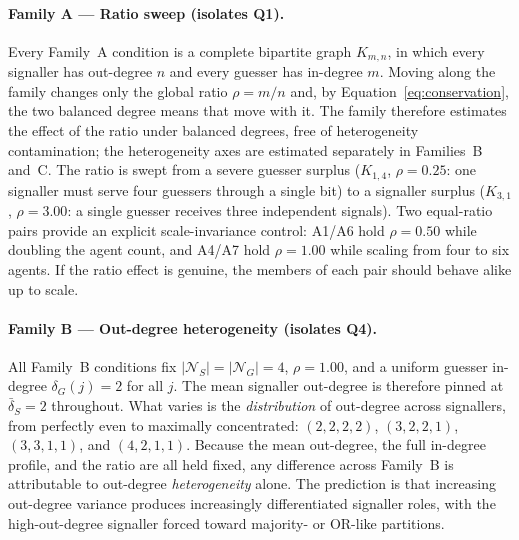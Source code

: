\documentclass[a4paper,twoside,12pt]{report}
\begin{document}
    \paragraph{Family A --- Ratio sweep (isolates Q1).}
    Every Family~A condition is a complete bipartite graph $K_{m,n}$, in which
    every signaller has out-degree $n$ and every guesser has in-degree $m$.
    Moving along the family changes only the global ratio
    $\rho = m/n$ and, by Equation~\eqref{eq:conservation}, the two balanced
    degree means that move with it. The family therefore estimates the effect
    of the ratio under balanced degrees, free of heterogeneity contamination;
    the heterogeneity axes are estimated separately in Families~B and~C. The
    ratio is swept from a severe guesser surplus ($K_{1,4}$, $\rho = 0.25$:
    one signaller must serve four guessers through a single bit) to a
    signaller surplus ($K_{3,1}$, $\rho = 3.00$: a single guesser receives
    three independent signals). Two equal-ratio pairs provide an explicit
    scale-invariance control: A1/A6 hold $\rho = 0.50$ while doubling the
    agent count, and A4/A7 hold $\rho = 1.00$ while scaling from four to six
    agents. If the ratio effect is genuine, the members of each pair should
    behave alike up to scale.
    
    \paragraph{Family B --- Out-degree heterogeneity (isolates Q4).}
    All Family~B conditions fix $|\mathcal{N}_S| = |\mathcal{N}_G| = 4$,
    $\rho = 1.00$, and a uniform guesser in-degree $\delta_G(j) = 2$ for all
    $j$. The mean signaller out-degree is therefore pinned at
    $\bar{\delta}_S = 2$ throughout. What varies is the \emph{distribution} of
    out-degree across signallers, from perfectly even to maximally
    concentrated:
    $(2,2,2,2)$, $(3,2,2,1)$, $(3,3,1,1)$, and $(4,2,1,1)$. Because the mean
    out-degree, the full in-degree profile, and the ratio are all held fixed,
    any difference across Family~B is attributable to out-degree
    \emph{heterogeneity} alone. The prediction
    is that increasing out-degree variance produces increasingly
    differentiated signaller roles, with the high-out-degree signaller forced
    toward majority- or OR-like partitions.
    
\end{document}

